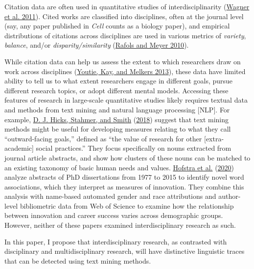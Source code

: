 \documentclass[
  11pt,
]{article}
\begin{document}
Citation data are often used in quantitative studies of interdisciplinarity (\protect\hyperlink{ref-WagnerApproachesUnderstandingMeasuring2011}{Wagner et al. 2011}). Cited works are classified into disciplines, often at the journal level (say, any paper published in \emph{Cell} counts as a biology paper), and empirical distributions of citations across disciplines are used in various metrics of \emph{variety}, \emph{balance}, and/or \emph{disparity/similarity} (\protect\hyperlink{ref-RafolsDiversityNetworkCoherence2010}{Rafols and Meyer 2010}).

While citation data can help us assess the extent to which researchers draw on work across disciplines (\protect\hyperlink{ref-YoutieBibliographicCouplingNetwork2013}{Youtie, Kay, and Melkers 2013}), these data have limited ability to tell us to what extent researchers engage in different goals, pursue different research topics, or adopt different mental models. Accessing these features of research in large-scale quantitative studies likely requires textual data and methods from text mining and natural language processing {[}NLP{]}. For example, \protect\hyperlink{ref-HicksImpactingCapabilitiesConceptual2018}{D. J. Hicks, Stahmer, and Smith} (\protect\hyperlink{ref-HicksImpactingCapabilitiesConceptual2018}{2018}) suggest that text mining methods might be useful for developing measures relating to what they call ``outward-facing goals,'' defined as ``the value of research for other {[}extra-academic{]} social practices.'' They focus specifically on nouns extracted from journal article abstracts, and show how clusters of these nouns can be matched to an existing taxonomy of basic human needs and values. \protect\hyperlink{ref-HofstraDiversityInnovationParadox2020}{Hofstra et al.} (\protect\hyperlink{ref-HofstraDiversityInnovationParadox2020}{2020}) analyze abstracts of PhD dissertations from 1977 to 2015 to identify novel word associations, which they interpret as measures of innovation. They combine this analysis with name-based automated gender and race attributions and author-level bibliometric data from Web of Science to examine how the relationship between innovation and career success varies across demographic groups. However, neither of these papers examined interdisciplinary research as such.

In this paper, I propose that interdisciplinary research, as contrasted with disciplinary and multidisciplinary research, will have distinctive linguistic traces that can be detected using text mining methods.
\end{document}
